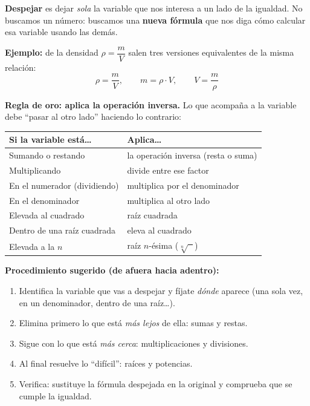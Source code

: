 \documentclass[12pt, letterpaper]{article}
\begin{document}
\begin{cuadroteoria}
  \textbf{Despejar} es dejar \emph{sola} la variable que nos interesa a un lado de la igualdad. No buscamos un número: buscamos una \textbf{nueva fórmula} que nos diga cómo calcular esa variable usando las demás.

  \textbf{Ejemplo:} de la densidad $\rho = \dfrac{m}{V}$ salen tres versiones equivalentes de la misma relación:
  $$\rho = \frac{m}{V}, \qquad m = \rho \cdot V, \qquad V = \frac{m}{\rho}$$
\end{cuadroteoria}

\begin{cuadroteoria}
  \textbf{Regla de oro: aplica la operación inversa.} Lo que acompaña a la variable debe ``pasar al otro lado'' haciendo lo contrario:
  \begin{center}
    \begin{tabular}{ll}
      \toprule
      Si la variable está\ldots        & Aplica\ldots                                          \\
      \midrule
      Sumando o restando              & la operación inversa (resta o suma)                    \\
      Multiplicando                   & divide entre ese factor                                \\
      En el numerador (dividiendo)    & multiplica por el denominador                          \\
      En el denominador               & multiplica al otro lado                                \\
      Elevada al cuadrado             & raíz cuadrada                                          \\
      Dentro de una raíz cuadrada     & eleva al cuadrado                                      \\
      Elevada a la $n$                & raíz $n$-ésima ($\sqrt[n]{\phantom{x}}$)               \\
      \bottomrule
    \end{tabular}
  \end{center}
\end{cuadroteoria}

\begin{cuadropasos}
  \textbf{Procedimiento sugerido (de afuera hacia adentro):}
  \begin{enumerate}[leftmargin=*]
    \item Identifica la variable que vas a despejar y fíjate \emph{dónde} aparece (una sola vez, en un denominador, dentro de una raíz\ldots).
    \item Elimina primero lo que está \emph{más lejos} de ella: sumas y restas.
    \item Sigue con lo que está \emph{más cerca}: multiplicaciones y divisiones.
    \item Al final resuelve lo ``difícil'': raíces y potencias.
    \item Verifica: sustituye la fórmula despejada en la original y comprueba que se cumple la igualdad.
  \end{enumerate}
\end{cuadropasos}
\end{document}
